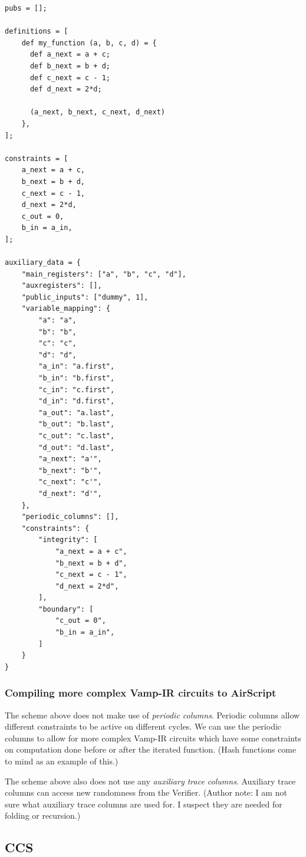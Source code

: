 \documentclass[
    9pt,            %
    techreport,        %
    affiltop,       %
]{art}
\begin{document}
\begin{verbatim}
pubs = [];

definitions = [
    def my_function (a, b, c, d) = {
      def a_next = a + c;
      def b_next = b + d;
      def c_next = c - 1;
      def d_next = 2*d;

      (a_next, b_next, c_next, d_next)
    },
];

constraints = [
    a_next = a + c,
    b_next = b + d,
    c_next = c - 1,
    d_next = 2*d,
    c_out = 0,
    b_in = a_in,
];

auxiliary_data = {
    "main_registers": ["a", "b", "c", "d"],
    "auxregisters": [],
    "public_inputs": ["dummy", 1],
    "variable_mapping": {
        "a": "a",
        "b": "b",
        "c": "c",
        "d": "d",
        "a_in": "a.first",
        "b_in": "b.first",
        "c_in": "c.first",
        "d_in": "d.first",
        "a_out": "a.last",
        "b_out": "b.last",
        "c_out": "c.last",
        "d_out": "d.last",
        "a_next": "a'",
        "b_next": "b'",
        "c_next": "c'",
        "d_next": "d'",
    },
    "periodic_columns": [],
    "constraints": {
        "integrity": [
            "a_next = a + c",
            "b_next = b + d",
            "c_next = c - 1",
            "d_next = 2*d",
        ],
        "boundary": [
            "c_out = 0",
            "b_in = a_in",
        ]
    }
}
\end{verbatim}

\subsubsection{Compiling more complex Vamp-IR circuits to AirScript}
The scheme above does not make use of \emph{periodic columns}. Periodic columns allow different constraints to be active on different cycles. We can use the periodic columns to allow for more complex Vamp-IR circuits which have some constraints on computation done before or after the iterated function. (Hash functions come to mind as an example of this.)

The scheme above also does not use any \emph{auxiliary trace columns}. Auxiliary trace columns can access new randomness from the Verifier. (Author note: I am not sure what auxiliary trace columns are used for. I suspect they are needed for folding or recursion.)

\subsection{CCS}
\end{document}
